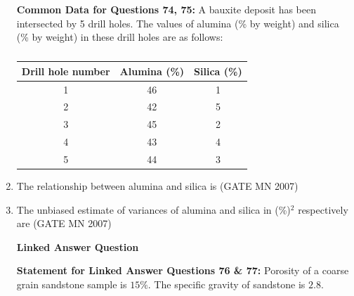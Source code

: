 \documentclass[journal]{IEEEtran}
\begin{document}
\begin{enumerate}
\textbf{Common Data for Questions 74, 75:}  
A bauxite deposit has been intersected by 5 drill holes. The values of alumina (\% by weight) and silica (\% by weight) in these drill holes are as follows:

\begin{table}[H]
    \centering\normalsize
\begin{tabular}{|c|c|c|}
\hline
Drill hole number & Alumina (\%) & Silica (\%) \\
\hline
1 & 46 & 1 \\
\hline
2 & 42 & 5 \\
\hline
3 & 45 & 2 \\
\hline
4 & 43 & 4 \\
\hline
5 & 44 & 3 \\
\hline
\end{tabular}
    \caption*{}
    \label{tab:Q74&75}
\end{table}

    \item The relationship between alumina and silica is  
	    \hfill (GATE MN 2007)
    \begin{enumerate}
    \end{enumerate}

    \item The unbiased estimate of variances of alumina and silica in (\%)$^2$ respectively are  
	    \hfill (GATE MN 2007)
    \begin{enumerate}
    \end{enumerate}


\begin{center}
	\textbf{Linked Answer Question}
\end{center}

\textbf{Statement for Linked Answer Questions 76 \& 77:}  
Porosity of a coarse grain sandstone sample is $15\%$. The specific gravity of sandstone is $2.8$.


\end{enumerate}
\end{document}
